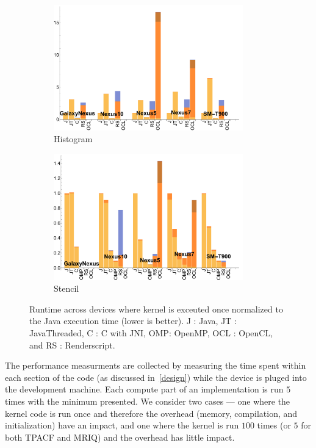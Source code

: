 \begin{figure}[t]
  \begin{subfigure}[b]{0.5\textwidth}
      \centering
      \includegraphics[width=0.9\textwidth]{data/Histogram_onecompute_time.pdf}
      \caption{Histogram}\label{fig:histo}
  \end{subfigure}
  \begin{subfigure}[b]{0.5\textwidth}
      \centering
      \includegraphics[width=0.9\textwidth]{data/Stencil_onecompute_time.pdf}
      \caption{Stencil}
      \label{fig:Stencil}
  \end{subfigure}

  \caption{Runtime across devices where kernel is exceuted once normalized to the Java execution time (lower is better). J : Java, JT : JavaThreaded, C : C with JNI, OMP: OpenMP, OCL : OpenCL, and RS : Renderscript.}
\end{figure}
\FloatBarrier

The performance measurments are collected by measuring the time
  spent within each section of the code (as discussed in~\ref{design})
  while the device is pluged into the development machine.
Each compute part of an implementation is run $5$ times with the minimum
  presented.
We consider two cases --- one where the kernel code is run once and therefore
  the overhead (memory, compilation, and initialization) have an impact,
  and one where the kernel is run $100$ times (or $5$ for both TPACF and MRIQ)
  and the overhead has little impact.


